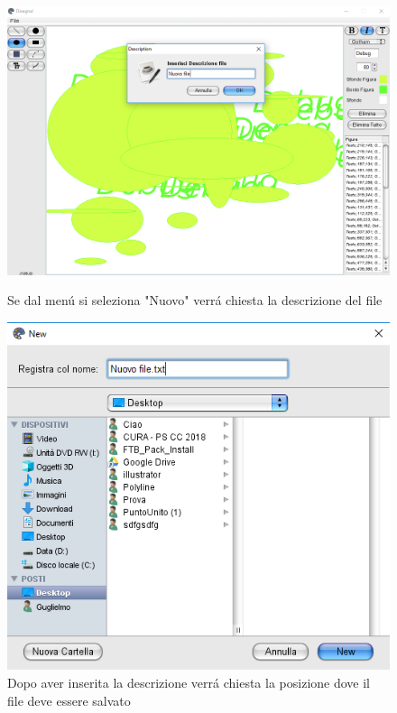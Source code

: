 \documentclass[a4paper,12pt,times,numbered,print,index]{article}
\begin{document}
\begin{figure}[2]
  \includegraphics[scale=.5]{Immagini/Debug/test2.png}
  \caption[Nuovo file]{Se dal menú si seleziona "Nuovo" verrá chiesta la descrizione del file}
   \includegraphics[scale=.8]{Immagini/Debug/test3.png}
  \caption[Nuovo file]{Dopo aver inserita la descrizione verrá chiesta la posizione dove il file deve essere salvato}
\end{figure}
\end{document}
